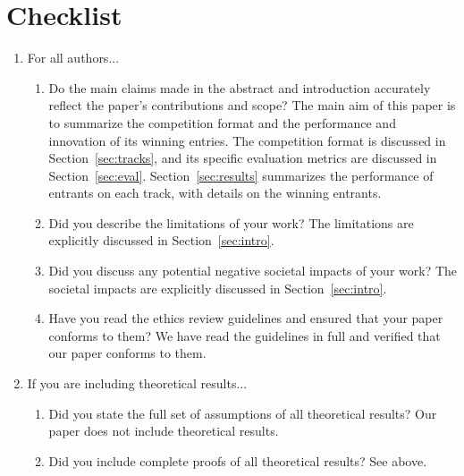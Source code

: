 \section*{Checklist}

\begin{enumerate}

\item For all authors...
\begin{enumerate}
  \item Do the main claims made in the abstract and introduction accurately reflect the paper's contributions and scope?
    \answerYes{} The main aim of this paper is to summarize the competition format and the performance and innovation of its winning entries. The competition format is discussed in Section~\ref{sec:tracks}, and its specific evaluation metrics are discussed in Section~\ref{sec:eval}. Section~\ref{sec:results} summarizes the performance of entrants on each track, with details on the winning entrants.
  \item Did you describe the limitations of your work?
    \answerYes{} The limitations are explicitly discussed in Section~\ref{sec:intro}.
  \item Did you discuss any potential negative societal impacts of your work?
    \answerYes{} The societal impacts are explicitly discussed in Section~\ref{sec:intro}.
  \item Have you read the ethics review guidelines and ensured that your paper conforms to them?
    \answerYes{} We have read the guidelines in full and verified that our paper conforms to them.
\end{enumerate}

\item If you are including theoretical results...
\begin{enumerate}
  \item Did you state the full set of assumptions of all theoretical results?
    \answerNA{} Our paper does not include theoretical results.
	\item Did you include complete proofs of all theoretical results?
    \answerNA{} See above.
\end{enumerate}


\end{enumerate}
